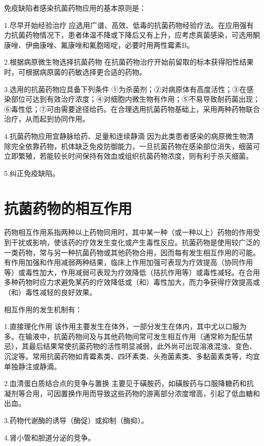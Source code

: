 免疫缺陷者感染抗菌药物应用的基本原则是：

1.尽早开始经验治疗
应选用广谱、高效、低毒的抗菌药物经验疗法。在应用强有力抗菌药物情况下，患者体温不降或下降后又有上升，应考虑真菌感染，可选用酮康唑、伊曲康唑、氟康唑和氟胞嘧啶，必要时用两性霉素B。

2.根据病原微生物选择抗菌药物
在抗菌药物治疗开始前留取的标本获得阳性结果时，可根据病原菌的药敏选择更合适的药物。

3.选用的抗菌药物应具备下列条件
①为杀菌剂；②对病原体有高度活性；③在感染部位可达到有效治疗浓度；④对细胞内微生物有作用；⑤不易导致耐药菌出现；⑥毒性低；⑦可由需要途径给药。在合理选用抗菌药物基础上，采用两种药物联合治疗，从而起到协同作用。

4.抗菌药物应用宜静脉给药、足量和连续静滴
因为此类患者感染的病原微生物清除完全依靠药物，机体缺乏免疫防御能力，一旦抗菌药物在感染部位消失，细菌可立即繁殖，若能较长时间保持有效血或组织抗菌药物浓度，则有利于杀灭细菌。

5.纠正免疫缺陷。

\protect\hypertarget{text00435.html}{}{}

\section{抗菌药物的相互作用}

药物相互作用系指两种以上药物同用时，其中某一种（或一种以上）药物的作用受到干扰或影响，使该药的疗效发生变化或产生毒性反应。抗菌药物是使用较广泛的一类药物，常与另一种抗菌药物或其他药物合用，因而每有发生相互作用的可能。有作用加强和作用减弱两种结果，临床上作用加强可表现为疗效提高（协同作用等）或毒性加大，作用减弱可表现为疗效降低（拮抗作用等）或毒性减轻。在合用多种药物时应力求避免某药的疗效降低或（和）毒性加大，而力争获得疗效提高或（和）毒性减轻的良好效果。

相互作用的发生机制有：

1.直接理化作用
该作用主要发生在体外，一部分发生在体内，其中尤以口服为多。在输液中，抗菌药物间及与其他药物间常可发生相互作用（通常称为配伍禁忌），其最后结果常使抗菌药物的活性明显减弱，此外尚可出现溶液混浊、变色、沉淀等。常用抗菌药物如青霉素类、四环素类、头孢菌素类、多黏菌素类等，均宜单独静注或静滴。

2.血清蛋白质结合点的竞争与置换
主要见于磺胺药，如磺胺药与口服降糖药和抗凝剂等合用，可因置换作用而导致这些药物的游离部分浓度增高，引起了低血糖和出血。

3.药物代谢酶的诱导（酶促）或抑制（酶抑）。

4.肾小管和胆道分泌的竞争。

